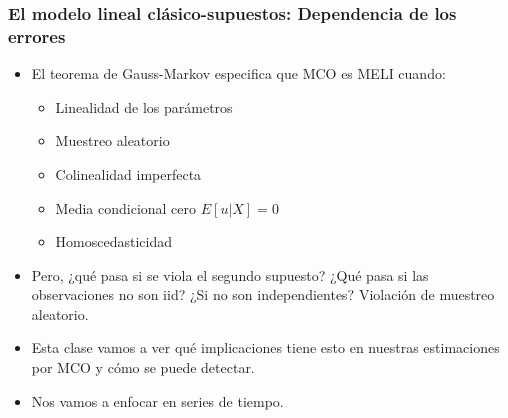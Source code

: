 \documentclass{beamer}
\begin{document}
\begin{frame}
\frametitle{El modelo lineal clásico-supuestos: Dependencia de los errores}

\begin{itemize}
  \item El teorema de Gauss-Markov especifica que MCO es MELI cuando:
  \begin{itemize}
    \item Linealidad de los parámetros
    \item Muestreo aleatorio
    \item Colinealidad imperfecta
    \item Media condicional cero $E[u|X]=0$
    \item Homoscedasticidad
  \end{itemize}
  \item Pero, ¿qué pasa si se viola el segundo supuesto? ¿Qué pasa si las observaciones no son iid? ¿Si no son independientes? Violación de muestreo aleatorio.
  \item Esta clase vamos a ver qué implicaciones tiene esto en nuestras estimaciones por MCO y cómo se puede detectar.
  \item Nos vamos a enfocar en series de tiempo.
\end{itemize}

\end{frame}
\end{document}
